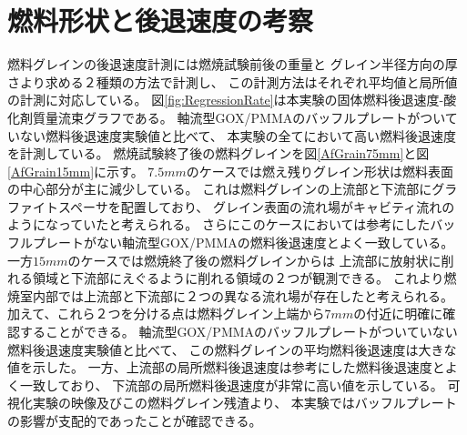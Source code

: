 \section{燃料形状と後退速度の考察}
燃料グレインの後退速度計測には燃焼試験前後の重量と
グレイン半径方向の厚さより求める２種類の方法で計測し、
この計測方法はそれぞれ平均値と局所値の計測に対応している。
図\ref{fig:RegressionRate}は本実験の固体燃料後退速度-酸化剤質量流束グラフである。
軸流型GOX/PMMAのバッフルプレートがついていない燃料後退速度実験値と比べて、
本実験の全てにおいて高い燃料後退速度を計測している。
燃焼試験終了後の燃料グレインを図\ref{AfGrain75mm}と図\ref{AfGrain15mm}に示す。
$7.5mm$のケースでは燃え残りグレイン形状は燃料表面の中心部分が主に減少している。
これは燃料グレインの上流部と下流部にグラファイトスペーサを配置しており、
グレイン表面の流れ場がキャビティ流れのようになっていたと考えられる。
さらにこのケースにおいては参考にしたバッフルプレートがない軸流型GOX/PMMAの燃料後退速度とよく一致している。
一方$15mm$のケースでは燃焼終了後の燃料グレインからは
上流部に放射状に削れる領域と下流部にえぐるように削れる領域の２つが観測できる。
これより燃焼室内部では上流部と下流部に２つの異なる流れ場が存在したと考えられる。
加えて、これら２つを分ける点は燃料グレイン上端から$7mm$の付近に明確に確認することができる。
軸流型GOX/PMMAのバッフルプレートがついていない燃料後退速度実験値と比べて、
この燃料グレインの平均燃料後退速度は大きな値を示した。
一方、上流部の局所燃料後退速度は参考にした燃料後退速度とよく一致しており、
下流部の局所燃料後退速度が非常に高い値を示している。
可視化実験の映像及びこの燃料グレイン残渣より、
本実験ではバッフルプレートの影響が支配的であったことが確認できる。
